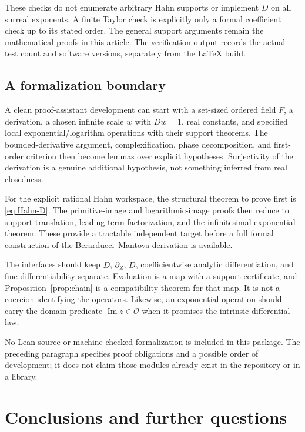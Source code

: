 \documentclass[11pt,a4paper]{article}
\numberwithin{equation}{section}
\theoremstyle{definition}
\theoremstyle{remark}
\newcommand{\OO}{\mathcal O}
\newcommand{\DD}{\widetilde D}
\newcommand{\Imm}{\operatorname{Im}}
\begin{document}
These checks do not enumerate arbitrary Hahn supports or implement $D$ on
all surreal exponents. A finite Taylor check is explicitly only a formal
coefficient check up to its stated order. The general support arguments
remain the mathematical proofs in this article. The verification output
records the actual test count and software versions, separately from the
LaTeX build.

\subsection{A formalization boundary}

A clean proof-assistant development can start with a set-sized ordered
field $F$, a derivation, a chosen infinite scale $w$ with $Dw=1$, real
constants, and specified local exponential/logarithm operations with their
support theorems. The bounded-derivative argument, complexification,
phase decomposition, and first-order criterion then become lemmas over
explicit hypotheses. Surjectivity of the derivation is a genuine additional
hypothesis, not something inferred from real closedness.

For the explicit rational Hahn workspace, the structural theorem to prove
first is \eqref{eq:Hahn-D}. The primitive-image and logarithmic-image
proofs then reduce to support translation, leading-term factorization,
and the infinitesimal exponential theorem. These provide a tractable
independent target before a full formal construction of the
Berarducci--Mantova derivation is available.

The interfaces should keep $D$, $\partial_Z$, $\DD$, coefficientwise
analytic differentiation, and fine differentiability separate. Evaluation
is a map with a support certificate, and Proposition~\ref{prop:chain} is a
compatibility theorem for that map. It is not a coercion identifying the
operators. Likewise, an exponential operation should carry the domain
predicate $\Imm z\in\OO$ when it promises the intrinsic differential law.

No Lean source or machine-checked formalization is included in this
package. The preceding paragraph specifies proof obligations and a possible
order of development; it does not claim those modules already exist in the
repository or in a library.

\section{Conclusions and further questions}
\label{sec:conclusion}
\end{document}
